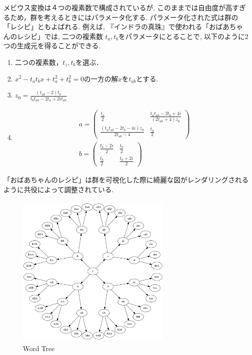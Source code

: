 メビウス変換は４つの複素数で構成されているが, このままでは自由度が高すぎ
るため，群を考えるときにはパラメータ化する.
パラメータ化された式は群の「レシピ」ともよばれる.
例えば, 『インドラの真珠』で使われる「おばあちゃんのレシピ」では, 二つの複素数
$t_a, t_b$をパラメータにとることで, 以下のように2つの生成元を得ることができる.
\begin{enumerate}
 \item 二つの複素数，$t_z, t_b$を選ぶ．
 \item  $x^2 - t_a t_b x + t_a^2 + t_b^2 = 0 \text{の一方の解}x\text{を}t_{ab} \text{とする. }$
 \item $z_0 = \frac{(t_{ab} -2)t_b}{t_b t_{ab} - 2 t_a + 2it_{ab}}$
 \item 
        \begin{align*}
       &a = \left(
      \begin{array}{ccc}
       \frac{t_a}{2} & \frac{t_a t_{ab} - 2 t_b + 4i}{(2 t_{ab} + 4)z_0} \\
       \frac{(t_a t_{ab} - 2 t_b -4i)z_0}{2 t_{ab} - 4} & \frac{t_a}{2}
      \end{array}
     \right)\\
 &b = \left(
      \begin{array}{ccc}
       \frac{t_b - 2i}{2} & \frac{t_b}{2} \\
       \frac{t_b}{2} & \frac{t_b + 2i}{2}
      \end{array}
     \right)
        \end{align*}
\end{enumerate}
「おばあちゃんのレシピ」は群を可視化した際に綺麗な図がレンダリングされるように共役によって調整されている.

\begin{figure}[htbp]
 \center
 \includegraphics[width=3in, height=3in, keepaspectratio]{../img/klein/wordTree.pdf}
 \caption{Word Tree}
 \label{fig:wordTree}
\end{figure}

